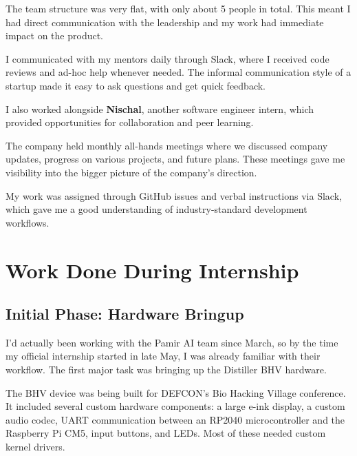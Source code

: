 \documentclass[12pt,a4paper]{report}
\begin{document}
The team structure was very flat, with only about 5 people in total. This meant I had direct communication with the leadership and my work had immediate impact on the product.

\vspace{0.3cm}

I communicated with my mentors daily through Slack, where I received code reviews and ad-hoc help whenever needed. The informal communication style of a startup made it easy to ask questions and get quick feedback.

\vspace{0.3cm}

I also worked alongside \textbf{Nischal}, another software engineer intern, which provided opportunities for collaboration and peer learning.

\vspace{0.3cm}

The company held monthly all-hands meetings where we discussed company updates, progress on various projects, and future plans. These meetings gave me visibility into the bigger picture of the company's direction.

\vspace{0.3cm}

My work was assigned through GitHub issues and verbal instructions via Slack, which gave me a good understanding of industry-standard development workflows.

\chapter{Work Done During Internship}

\section{Initial Phase: Hardware Bringup}

I'd actually been working with the Pamir AI team since March, so by the time my official internship started in late May, I was already familiar with their workflow. The first major task was bringing up the Distiller BHV hardware.

\vspace{0.3cm}

The BHV device was being built for DEFCON's Bio Hacking Village conference. It included several custom hardware components: a large e-ink display, a custom audio codec, UART communication between an RP2040 microcontroller and the Raspberry Pi CM5, input buttons, and LEDs. Most of these needed custom kernel drivers.
\end{document}
